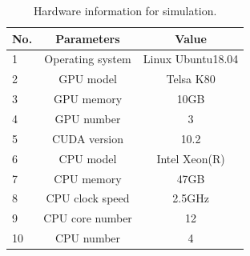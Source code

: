 \documentclass[10pt,twocolumn,letterpaper]{article}
\begin{document}
\begin{table}
\begin{center}
	\begin{tabular}{lcc}
		\hline	
		No. &Parameters    &Value	\\
		\hline
		1  &Operating system &Linux Ubuntu18.04 \\
		2  &GPU model &Telsa K80\\
		3  &GPU memory &10GB\\
		4  &GPU number &3\\
		5  &CUDA version&10.2\\
		6  &CPU model  &Intel Xeon(R) \\
		7  &CPU memory &47GB\\
		8  &CPU clock speed &2.5GHz\\
		9  &CPU core number &12\\
		10 &CPU number &4\\
		\hline
	\end{tabular}
\end{center}
\caption{Hardware information for simulation.}
\label{tab2}
\end{table}
\end{document}

